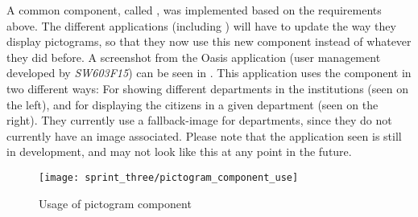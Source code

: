 A common component, called , was implemented based on the requirements above. The different applications (including \ct) will have to update the way they display pictograms, so that they now use this new component instead of whatever they did before. A screenshot from the Oasis application (user management developed by \emph{SW603F15}) can be seen in . This application uses the component in two different ways: For showing different departments in the institutions (seen on the left), and for displaying the citizens in a given department (seen on the right). They currently use a fallback-image for departments, since they do not currently have an image associated. Please note that the application seen is still in development, and may not look like this at any point in the future. 

\begin{figure}[!htbp]
	\centering
	\texttt{[image: sprint\_three/pictogram\_component\_use]}
	\caption{Usage of pictogram component}
	\label{fig:pictogram_component_use}
\end{figure}
